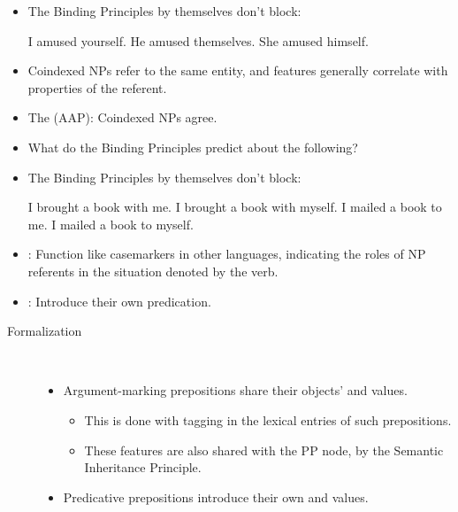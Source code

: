 \documentclass[a4paper,landscape,headrule,footrule]{foils}
\begin{document}
\begin{itemize}
\item The Binding Principles by themselves don’t block:
  \begin{exe}
    \ix * I amused yourself.
    \ix * He amused themselves.
    \ix * She amused himself.
  \end{exe}
\item Coindexed NPs refer to the same entity, and  features
generally correlate with properties of the referent.
\item The  (AAP):
Coindexed NPs agree.
\end{itemize}

\begin{itemize}
\item What do the Binding Principles predict about the
following?
\item The Binding Principles by themselves don’t block:
  \begin{exe}
    \ix I brought a book with me.
    \ix *I brought a book with myself.
    \ix *I mailed a book to me.
    \ix I mailed a book to myself.
  \end{exe}
\end{itemize}

\begin{itemize}
\item {}: Function like casemarkers in other languages, indicating the
roles of NP referents in the situation denoted by the verb.
\item {}: Introduce their own predication.
\end{itemize}

\begin{description}
\item [Formalization] ~\\[-2ex]
  \begin{itemize}
  \item Argument-marking prepositions share their
    objects'  and  values.
    \begin{itemize}
    \item This is done with tagging in the lexical
      entries of such prepositions.
    \item These features are also shared with the PP
      node, by the Semantic Inheritance Principle.
    \end{itemize}
  \item Predicative prepositions introduce their own
 and  values.
\end{itemize}
\end{description}
\end{document}
